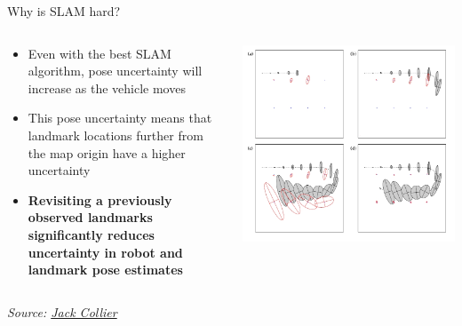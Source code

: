\documentclass[compress,xcolor=table]{beamer}
\newcommand{\source}[2]{{\tiny\it Source: \href{#1}{#2}}}
\begin{document}
\begin{frame}{Why is SLAM hard?}
{\begin{columns}
\begin{column}{0.5\linewidth}
                    \begin{itemize}
                        \item Even with the best SLAM algorithm, pose
                            uncertainty will increase as the vehicle moves
                        \item This pose uncertainty means that landmark
                            locations further from the map origin have a higher
                            uncertainty
                        \item \textbf{Revisiting a previously observed landmarks
                            significantly reduces uncertainty in robot and
                            landmark pose estimates}
                    \end{itemize}

            \end{column}
            \begin{column}{0.5\linewidth}
                \begin{center}
                    \includegraphics[width=\linewidth]{loopclosure}
                \end{center}
            \end{column}
        \end{columns}
    }

\source{http://www.computerrobotvision.org/2010/slam_camp/collier_intro.pdf}{Jack Collier}
\end{frame}
\end{document}
